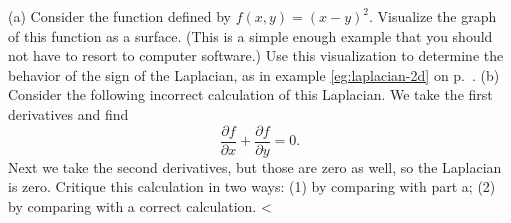 (a) Consider the function defined by $f(x,y)=(x-y)^2$. Visualize the graph
of this function as a surface. (This is a simple enough example that you
should not have to resort to computer software.)  Use this visualization to
determine the behavior of the sign of the Laplacian, as in 
example \ref{eg:laplacian-2d} on p.~\pageref{eg:laplacian-2d}.\hwendpart
(b) Consider the following incorrect calculation of this Laplacian. We take
the first derivatives and find
\begin{equation*}
  \frac{\partial f}{\partial x}+\frac{\partial f}{\partial y} = 0.
\end{equation*}
Next we take the second derivatives, but those are zero as well, so the
Laplacian is zero.
Critique this calculation in two ways: (1) by comparing with part a;
(2) by comparing with a correct calculation.\hwendpart
{}
<%
